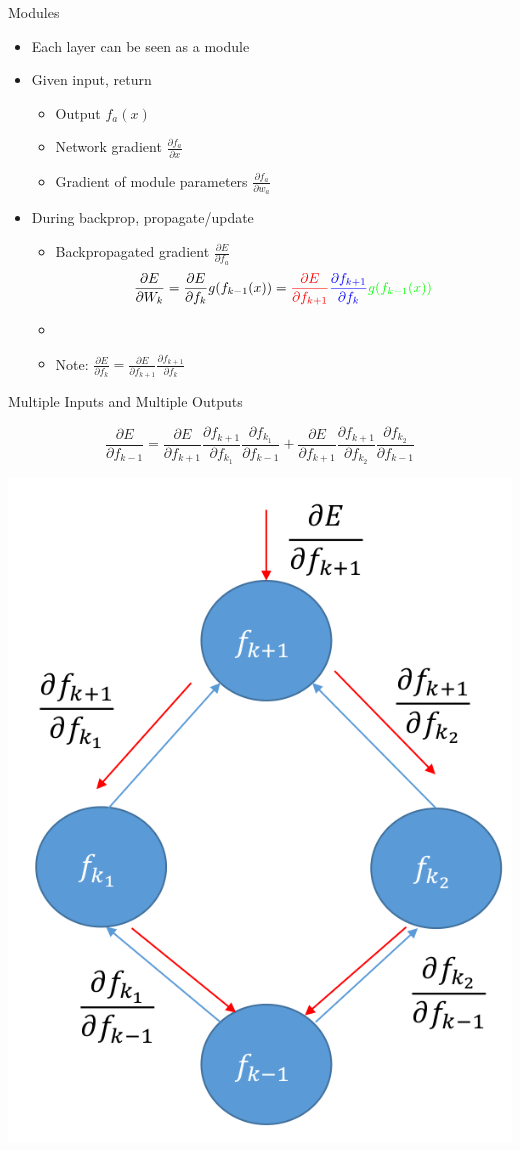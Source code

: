 \documentclass[12pt,notes,mathserif]{beamer}
\newcommand{\pp}[2]{\frac{\partial #1}{\partial #2}}
\newcommand{\red}[1]{ {\color{red}{#1}} }
\newcommand{\blue}[1]{ {\color{blue}{#1}} }
\newcommand{\green}[1]{ {\color{green}{#1}} }
\providecommand{\tightlist}{%
	\setlength{\itemsep}{0pt}\setlength{\parskip}{0pt}}
\begin{document}
\begin{frame}{Modules}

\begin{itemize}
    \tightlist
    \item Each layer can be seen as a module
    \item Given input, return
    \begin{itemize}
        \tightlist
        \item  Output $f_{a}(x)$
        \item   Network gradient $\frac{\partial f_{a}}{\partial x}$
        \item  Gradient of module parameters $\frac{\partial f_{a}}{\partial w_a}$
    \end{itemize}
\end{itemize}

\begin{itemize}
\tightlist
\item
  During backprop, propagate/update

  \begin{itemize}
  \tightlist
  \item
    Backpropagated gradient \(\frac{\partial E}{\partial f_{a}}\)
    \[\frac{\partial E}{\partial W_{k}}=
    \frac{\partial E}{\partial f_{k}} g(f_{k-1}( x))=
    \red{\frac{\partial E}{\partial f_{k + 1} }}
    \blue{\pp{f_{k+1}}{f_k}}
    \green{g(f_{k-1}(x))}\]
  \item
    \red{Backprop signal} \blue{Network Gradient}
    \green{gradient of  parameters}
  \item
    Note:
    \(\frac{\partial E}{\partial f_{k}}=\pp{E}{f_{k+1}} \pp{f_{k+1}}{{f_k}}\)
  \end{itemize}
\end{itemize}

\end{frame}

\begin{frame}{Multiple Inputs and Multiple Outputs}

\[\frac{\partial E}{\partial f_{k-1}}=\pp{E}{f_{k+1}}\pp{f_{k+1}}{f_{k_1}}\pp{f_{k_1}}{f_{k-1}}+\pp{E}{f_{k+1}} \pp{f_{k+1}}{f_{k_2}}\pp{f_{k_2}}{f_{k-1}}\]

\begin{center}
    \includegraphics[width=.4\textwidth]{2018-04-15-13-10-08.png}
\end{center}

\end{frame}
\end{document}
